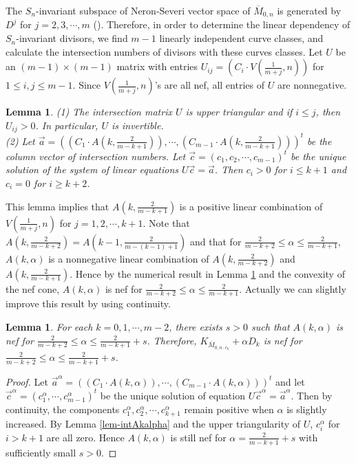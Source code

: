 \documentclass[10pt]{amsart}
\newtheorem{lemma}[theorem]{Lemma}
\theoremstyle{definition}
\def\Mzn{\overline{M}_{0,n} }
\def\Mzek{\overline{M}_{0,n\cdot \epsilon_k} }
\begin{document}
The $S_n$-invariant subspace of Neron-Severi vector space of
$\Mzn$ is generated by $D^j$ for $j=2,3, \cdots, m$ (\cite[Theorem
1.3]{KeelMcKer}). Therefore, in order to determine the linear
dependency of $S_n$-invariant divisors, we find $m-1$ linearly
independent curve classes, and calculate the intersection numbers
of divisors with these curves classes. Let $U$ be an $(m-1) \times
(m-1)$ matrix with entries $U_{ij} = (C_i \cdot V(\frac{1}{m+j},
n))$ for $1 \le i,j \le m-1$. Since $V(\frac{1}{m+j}, n)$'s are
all nef, all entries of $U$ are nonnegative.
\begin{lemma}\cite[\S3.2, \S3.3]{AlexSwin}\label{lem-nefbdl}
(1) The intersection matrix $U$ is upper triangular and
if $i \le j$, then $U_{ij} > 0$. In particular, $U$ is invertible.\\
(2) Let $\vec{a} = ((C_1 \cdot A(k, \frac{2}{m-k+1})), \cdots,
(C_{m-1} \cdot A(k,\frac{2}{m-k+1})))^t$ be the column vector
of intersection numbers.
Let $\vec{c} = (c_1, c_2, \cdots, c_{m-1})^t$ be the
unique solution of the system of linear equations
$U \vec{c} = \vec{a}$.
Then $c_i > 0$ for $i \le k+1$ and $c_i = 0$ for $i \ge k+2$.
\end{lemma}

This lemma implies that $A(k,\frac{2}{m-k+1})$ is a positive
linear combination of $V(\frac{1}{m+j}, n)$ for $j = 1, 2, \cdots,
k+1$. Note that $A(k,\frac{2}{m-k+2}) =
A(k-1,\frac{2}{m-(k-1)+1})$ and that for $\frac{2}{m-k+2} \le
\alpha \le \frac{2}{m-k+1}$, $A(k,\alpha)$ is a nonnegative linear
combination of $A(k,\frac{2}{m-k+2})$ and $A(k,\frac{2}{m-k+1})$.
Hence by the numerical result in Lemma \ref{lem-nefbdl} and the
convexity of the nef cone, $A(k,\alpha)$ is nef for
$\frac{2}{m-k+2} \le \alpha \le \frac{2}{m-k+1}$. Actually we can
slightly improve this result by using continuity.

\begin{lemma}\label{lem-otherextreme}
For each $k = 0,1,\cdots,m-2$, there exists $s > 0$ such that
$A(k,\alpha)$ is nef for $\frac{2}{m-k+2} \le \alpha \le
\frac{2}{m-k+1}+s$. Therefore, $K_{\Mzek}+\alpha D_k$ is nef for
$\frac{2}{m-k+2} \le \alpha \le \frac{2}{m-k+1}+s$.
\end{lemma}
\begin{proof}
Let $\vec{a}^\alpha = ((C_1 \cdot A(k,\alpha)), \cdots, (C_{m-1}
\cdot A(k,\alpha)))^t$ and let $\vec{c}^\alpha = (c^\alpha_1,
\cdots, c^\alpha_{m-1})^t$ be the unique solution of equation $U
\vec{c}^\alpha = \vec{a}^\alpha$. Then by continuity, the
components $c^\alpha_1, c^\alpha_2, \cdots, c^\alpha_{k+1}$ remain
positive when $\alpha$ is slightly increased. By Lemma
\ref{lem-intAkalpha} and the upper triangularity of $U$,
$c^\alpha_i$ for $i > k+1$ are all zero. Hence $A(k, \alpha)$ is
still nef for $\alpha = \frac{2}{m-k+1}+s$ with sufficiently small
$s > 0$.
\end{proof}
\end{document}

